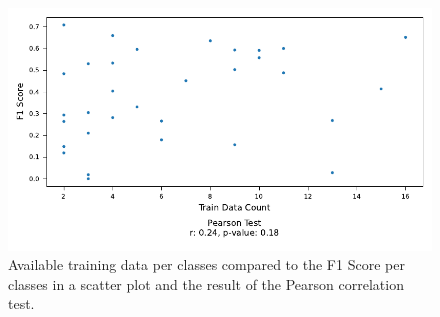 \begin{figure}[h]
\centering
\captionsetup{width=0.8\linewidth}
\includegraphics{figures/f1_per_class_to_data_distribution.pdf}
\caption{Available training data per classes compared to the F1 Score per classes in a scatter plot and the result of the Pearson correlation test.}
\label{fig:f1_per_class_to_data_distribution}
\end{figure}
